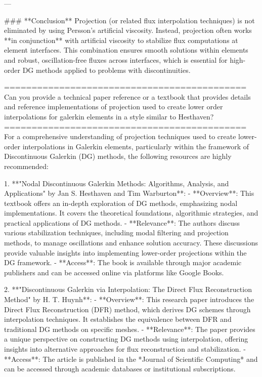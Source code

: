 ---

### **Conclusion**
Projection (or related flux interpolation techniques) is not eliminated by using Persson's artificial viscosity. Instead, projection often works **in conjunction** with artificial viscosity to stabilize flux computations at element interfaces. This combination ensures smooth solutions within elements and robust, oscillation-free fluxes across interfaces, which is essential for high-order DG methods applied to problems with discontinuities.

============================================
Can you provide a technical paper reference or a textbook that provides details and reference implementations of projection used to create lower order interpolations for galerkin elements in a style similar to Hesthaven?
============================================
For a comprehensive understanding of projection techniques used to create lower-order interpolations in Galerkin elements, particularly within the framework of Discontinuous Galerkin (DG) methods, the following resources are highly recommended:

1. **"Nodal Discontinuous Galerkin Methods: Algorithms, Analysis, and Applications" by Jan S. Hesthaven and Tim Warburton**:
   - **Overview**: This textbook offers an in-depth exploration of DG methods, emphasizing nodal implementations. It covers the theoretical foundations, algorithmic strategies, and practical applications of DG methods.
   - **Relevance**: The authors discuss various stabilization techniques, including modal filtering and projection methods, to manage oscillations and enhance solution accuracy. These discussions provide valuable insights into implementing lower-order projections within the DG framework.
   - **Access**: The book is available through major academic publishers and can be accessed online via platforms like Google Books.

2. **"Discontinuous Galerkin via Interpolation: The Direct Flux Reconstruction Method" by H. T. Huynh**:
   - **Overview**: This research paper introduces the Direct Flux Reconstruction (DFR) method, which derives DG schemes through interpolation techniques. It establishes the equivalence between DFR and traditional DG methods on specific meshes.
   - **Relevance**: The paper provides a unique perspective on constructing DG methods using interpolation, offering insights into alternative approaches for flux reconstruction and stabilization.
   - **Access**: The article is published in the *Journal of Scientific Computing* and can be accessed through academic databases or institutional subscriptions.

